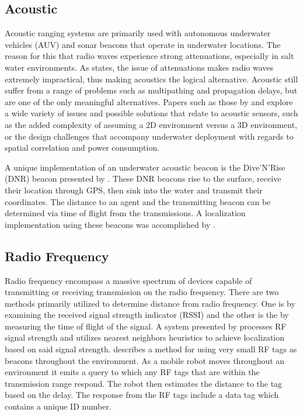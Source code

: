 \documentclass[conference]{IEEEtran}
\begin{document}
		\subsection{Acoustic}
	
			Acoustic ranging systems are primarily used with autonomous underwater vehicles (AUV) and sonar beacons that operate in underwater locations. The reason for this that radio waves experience strong attenuations, especially in salt water environments. As \cite{Partan2007} states, the issue of attenuations makes radio waves extremely impractical, thus making acoustics the logical alternative. Acoustic still suffer from a range of problems such as multipathing and propagation delays, but are one of the only meaningful alternatives. Papers such as those by \cite{Erol-Kantarci2011} and \cite{Akyildiz2005} explore a wide variety of issues and possible solutions that relate to acoustic sensors, such as the added complexity of assuming a 2D environment versus a 3D environment, or the design challenges that accompany underwater deployment with regards to spatial correlation and power consumption. 
		  	
			A unique implementation of an underwater acoustic beacon is the Dive'N'Rise (DNR) beacon presented by \cite{Erol2007}. These DNR beacons rise to the surface, receive their location through GPS, then sink into the water and transmit their coordinates. The distance to an agent and the transmitting beacon can be determined via time of flight from the transmissions. A localization implementation using these beacons was accomplished by \cite{Erol2008}. 
	

		\subsection{Radio Frequency}
			Radio frequency encompass a massive spectrum of devices capable of transmitting or receiving transmission on the radio frequency. There are two methods primarily utilized to determine distance from radio frequency. One is by examining the received signal strength indicator (RSSI) and the other is the by measuring the time of flight of the signal. A system presented by \cite{Padmanabhan2000} processes RF signal strength and utilizes nearest neighbors heuristics to achieve localization based on said signal strength.  \cite{Kurth2003a} describes a method for using very small RF tags as beacons throughout the environment.  As a mobile robot moves throughout an environment it emits a query to which any RF tags that are within the transmission range respond. The robot then estimates the distance to the tag based on the delay. The response from the RF tags include a data tag which contains a unique ID number. 
			
\end{document}
